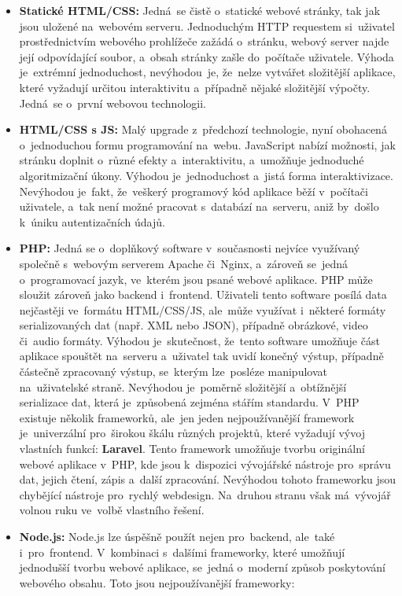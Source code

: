 \begin{itemize}
    \item \textbf{Statické HTML/CSS:} Jedná~se čistě o~statické webové
        stránky, tak jak jsou uložené na~webovém serveru. Jednoduchým
        HTTP requestem si~uživatel prostřednictvím webového prohlížeče
        zažádá o~stránku, webový server najde její odpovídající soubor,
        a~obsah stránky zašle do~počítače uživatele. Výhoda je~extrémní
        jednoduchost, nevýhodou~je, že~nelze vytvářet složitější aplikace,
        které vyžadují určitou interaktivitu a~případně nějaké složitější
        výpočty. Jedná~se o~první webovou technologii.
    \item \textbf{HTML/CSS s JS:} Malý upgrade z~předchozí technologie,
        nyní obohacená o~jednoduchou formu programování na~webu. JavaScript
        nabízí možnosti, jak stránku doplnit o~různé efekty a~interaktivitu,
        a~umožňuje jednoduché algoritmizační úkony. Výhodou je~jednoduchost
        a~jistá forma interaktivizace. Nevýhodou je~fakt, že~veškerý
        programový kód aplikace běží v~počítači uživatele, a~tak není možné
        pracovat s~databází na~serveru, aniž by~došlo k~úniku autentizačních
        údajů.
    \item \textbf{PHP:} Jedná se o~doplňkový software v~současnosti nejvíce
        využívaný společně s~webovým serverem Apache či~Nginx, a~zároveň
        se~jedná o~programovací jazyk, ve~kterém jsou psané webové aplikace.
        PHP může sloužit zároveň jako backend i~frontend. Uživateli tento
        software posílá data nejčastěji ve~formátu HTML/CSS/JS, ale~může
        využívat i~některé formáty serializovaných dat (např. XML nebo JSON),
        případně obrázkové, video či~audio formáty. Výhodou je~skutečnost,
        že~tento software umožňuje část aplikace spouštět na~serveru
        a~uživatel tak uvidí konečný výstup, případně částečně zpracovaný
        výstup, se~kterým lze~posléze manipulovat na~uživatelské straně.
        Nevýhodou je~poměrně složitější a~obtížnější serializace dat, která
        je~způsobená zejména stářím standardu. V~PHP existuje několik
        frameworků, ale~jen jeden nejpoužívanější framework je~univerzální
        pro~širokou škálu různých projektů, které vyžadují vývoj vlastních
        funkcí: \textbf{Laravel}. Tento framework umožňuje tvorbu originální
        webové aplikace v~PHP, kde jsou k~dispozici vývojářské nástroje
        pro~správu dat, jejich čtení, zápis a~další zpracování. Nevýhodou
        tohoto frameworku jsou chybějící nástroje pro~rychlý webdesign.
        Na~druhou stranu však má~vývojář volnou ruku ve~volbě vlastního
        řešení.
    \item \textbf{Node.js:} Node.js lze úspěšně použít nejen pro~backend,
        ale~také i~pro~frontend. V~kombinaci s~dalšími frameworky, které
        umožňují jednodušší tvorbu webové aplikace, se~jedná o~moderní
        způsob poskytování webového obsahu. Toto jsou nejpoužívanější
        frameworky:


\end{itemize}
